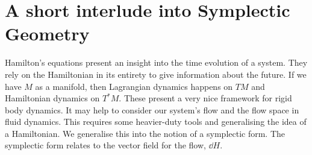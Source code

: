 
\section{A short interlude into Symplectic Geometry}
Hamilton's equations present an insight into the time evolution of a system. They rely on the Hamiltonian in its entirety to give information about the future. If we have $M$ as a manifold, then Lagrangian dynamics happens on $TM$ and Hamiltonian dynamics on $T^*M$. These present a very nice framework for rigid body dynamics. It may help to consider our system's flow and the flow space in fluid dynamics. This requires some heavier-duty tools and generalising the idea of a Hamiltonian. We generalise this into the notion of a symplectic form. The symplectic form relates to the vector field for the flow, $\dd H$.\\

